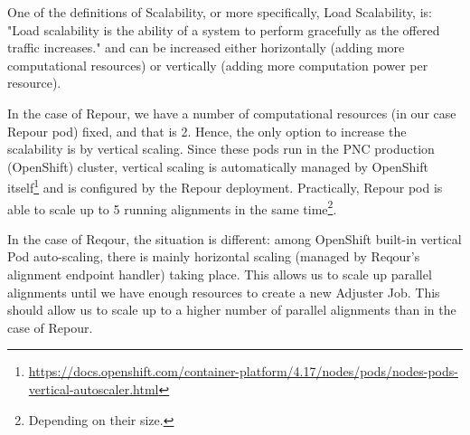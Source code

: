 \documentclass[../main.tex]{subfiles}
\begin{document}
One of the definitions of Scalability, or more specifically, Load Scalability, is: "Load scalability is the ability of a system to perform gracefully as the offered traffic increases."\cite{scalability} and can be increased either horizontally (adding more computational resources) or vertically (adding more computation power per resource).

In the case of Repour, we have a number of computational resources (in our case Repour pod) fixed, and that is 2. Hence, the only option to increase the scalability is by vertical scaling. Since these pods run in the PNC production (OpenShift) cluster, vertical scaling is automatically managed by OpenShift itself\footnote{\url{https://docs.openshift.com/container-platform/4.17/nodes/pods/nodes-pods-vertical-autoscaler.html}} and is configured by the Repour deployment. Practically, Repour pod is able to scale up to 5 running alignments in the same time\footnote{Depending on their size.}.

In the case of Reqour, the situation is different: among OpenShift built-in vertical Pod auto-scaling, there is mainly horizontal scaling (managed by Reqour's alignment endpoint handler) taking place. This allows us to scale up parallel alignments until we have enough resources to create a new Adjuster Job. This should allow us to scale up to a higher number of parallel alignments than in the case of Repour.
\end{document}

